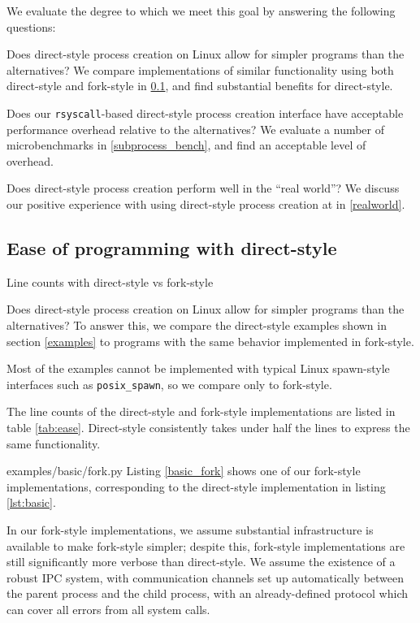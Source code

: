 \documentclass[letterpaper,twocolumn,10pt]{article}
\begin{document}
We evaluate the degree to which we meet this goal by answering the following questions:
\begin{compactitem}
\item
  Does direct-style process creation on Linux allow for simpler programs than the alternatives?
  We compare implementations of similar functionality using both direct-style and fork-style in \ref{ease},
  and find substantial benefits for direct-style.
\item
  Does our \texttt{rsyscall}-based direct-style process creation interface
  have acceptable performance overhead relative to the alternatives?
  We evaluate a number of microbenchmarks in \ref{subprocess_bench},
  and find an acceptable level of overhead.
\item
  Does direct-style process creation perform well in the ``real world''?
  We discuss our positive experience with using direct-style process creation at \twosigma{} in \ref{realworld}.
\end{compactitem}
\subsection{Ease of programming with direct-style}\label{ease}
\begin{table}

\caption{Line counts with direct-style vs fork-style}
\label{tab:ease}
\end{table}
Does direct-style process creation on Linux allow for simpler programs than the alternatives?
To answer this, we compare the direct-style examples shown in section \ref{examples}
to programs with the same behavior implemented in fork-style.

Most of the examples cannot be implemented with typical Linux spawn-style interfaces such as \verb|posix_spawn|,
so we compare only to fork-style.

The line counts of the direct-style and fork-style implementations are listed in table \ref{tab:ease}.
Direct-style consistently takes under half the lines to express the same functionality.


{examples/basic/fork.py}
Listing \ref{basic_fork} shows one of our fork-style implementations,
corresponding to the direct-style implementation in listing \ref{lst:basic}.

In our fork-style implementations,
we assume substantial infrastructure is available to make fork-style simpler;
despite this, fork-style implementations are still significantly more verbose than direct-style.
We assume the existence of a robust IPC system,
with communication channels set up automatically between the parent process and the child process,
with an already-defined protocol which can cover all errors from all system calls.
\end{document}
